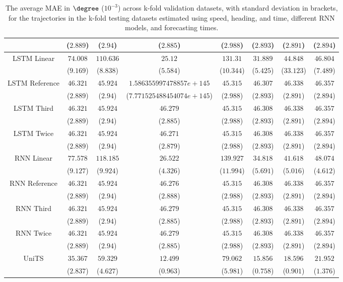 \begin{table}[!ht]
{\begin{tabular}{|c|c|c|c|c|c|c|c|}
			 & ($2.889$) & ($2.94$) & ($2.885$) & ($2.988$) & ($2.893$) & ($2.891$) & ($2.894$) \\ \hline
			\multirow{2}{*}{LSTM Linear} & $74.008$ & $110.636$ & $25.12$ & $131.31$ & $31.889$ & $44.848$ & $46.804$ \\
			 & ($9.169$) & ($8.838$) & ($5.584$) & ($10.344$) & ($5.425$) & ($33.123$) & ($7.489$) \\ \hline
			\multirow{2}{*}{LSTM Reference} & $46.321$ & $45.924$ & $1.586355997478857e+145$ & $45.315$ & $46.307$ & $46.338$ & $46.357$ \\
			 & ($2.889$) & ($2.94$) & ($7.771525488454074e+145$) & ($2.988$) & ($2.893$) & ($2.891$) & ($2.894$) \\ \hline
			\multirow{2}{*}{LSTM Third} & $46.321$ & $45.924$ & $46.279$ & $45.315$ & $46.308$ & $46.338$ & $46.357$ \\
			 & ($2.889$) & ($2.94$) & ($2.885$) & ($2.988$) & ($2.893$) & ($2.891$) & ($2.894$) \\ \hline
			\multirow{2}{*}{LSTM Twice} & $46.321$ & $45.924$ & $46.271$ & $45.315$ & $46.308$ & $46.338$ & $46.357$ \\
			 & ($2.889$) & ($2.94$) & ($2.879$) & ($2.988$) & ($2.893$) & ($2.891$) & ($2.894$) \\ \hline
			\multirow{2}{*}{RNN Linear} & $77.578$ & $118.185$ & $26.522$ & $139.927$ & $34.818$ & $41.618$ & $48.074$ \\
			 & ($9.127$) & ($9.924$) & ($4.326$) & ($11.994$) & ($5.691$) & ($5.016$) & ($4.612$) \\ \hline
			\multirow{2}{*}{RNN Reference} & $46.321$ & $45.924$ & $46.276$ & $45.315$ & $46.308$ & $46.338$ & $46.357$ \\
			 & ($2.889$) & ($2.94$) & ($2.888$) & ($2.988$) & ($2.893$) & ($2.891$) & ($2.894$) \\ \hline
			\multirow{2}{*}{RNN Third} & $46.321$ & $45.924$ & $46.279$ & $45.315$ & $46.308$ & $46.338$ & $46.357$ \\
			 & ($2.889$) & ($2.94$) & ($2.885$) & ($2.988$) & ($2.893$) & ($2.891$) & ($2.894$) \\ \hline
			\multirow{2}{*}{RNN Twice} & $46.321$ & $45.924$ & $46.279$ & $45.315$ & $46.308$ & $46.338$ & $46.357$ \\
			 & ($2.889$) & ($2.94$) & ($2.885$) & ($2.988$) & ($2.893$) & ($2.891$) & ($2.894$) \\ \hline
			\multirow{2}{*}{UniTS} & $35.367$ & $59.329$ & $12.499$ & $79.062$ & $15.856$ & $18.596$ & $21.952$ \\
			 & ($2.837$) & ($4.627$) & ($0.963$) & ($5.981$) & ($0.758$) & ($0.901$) & ($1.376$) \\ \hline
		\end{tabular}
	}
	\caption{The average MAE in $\degree$ ($10^{-3}$) across k-fold validation datasets, with standard deviation in brackets, for the trajectories in the k-fold testing datasets estimated using speed, heading, and time, different RNN models, and forecasting times.}
	\label{tab:all_speed_actual_dir_MAE}
\end{table}